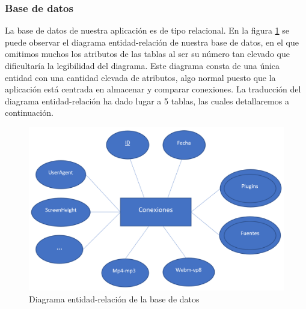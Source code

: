 \subsubsection{Base de datos}
La base de datos de nuestra aplicación es de tipo relacional. En la figura \ref{fig:diagramaEntidadRelacion} se puede observar el diagrama entidad-relación de nuestra base de datos, en el que omitimos muchos los atributos de las tablas al ser su número tan elevado que dificultaría la legibilidad del diagrama. Este diagrama consta de una única entidad con una cantidad elevada de atributos, algo normal puesto que la aplicación está centrada en almacenar y comparar conexiones. La traducción del diagrama entidad-relación ha dado lugar a 5 tablas, las cuales detallaremos a continuación.
\begin{figure}[tbp]
    \centering
    \includegraphics[width=1\textwidth]{Images/entidad relacion.png}
    \caption{Diagrama entidad-relación de la base de datos}
    \label{fig:diagramaEntidadRelacion}
\end{figure}
